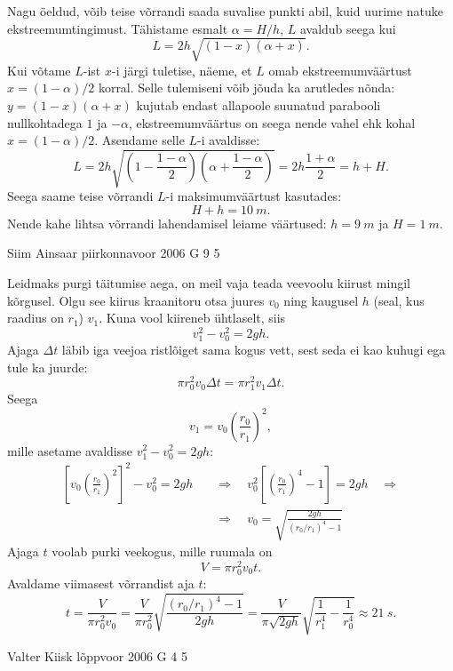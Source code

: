 \documentclass[11pt, twoside]{article}
\begin{document}
{{Nagu öeldud, võib teise võrrandi saada suvalise punkti abil, kuid uurime natuke ekstreemumtingimust. Tähistame esmalt $\alpha = H/h$, $L$ avaldub seega kui
\[
L=2 h \sqrt{(1-x)(\alpha+x)}.
\]
Kui võtame $L$-ist $x$-i järgi tuletise, näeme, et $L$ omab ekstreemumväärtust $x = (1 - \alpha )/2$ korral. Selle tulemiseni võib jõuda ka arutledes nõnda: $y = (1-x)(\alpha +x)$ kujutab endast allapoole suunatud parabooli nullkohtadega $1$ ja $-\alpha$, ekstreemumväärtus on seega nende vahel ehk kohal $x = (1 - \alpha )/2$. Asendame selle $L$-i avaldisse:
\[
L=2 h \sqrt{\left(1-\frac{1-\alpha}{2}\right)\left(\alpha+\frac{1-\alpha}{2}\right)}=2 h \frac{1+\alpha}{2}=h+H.
\]
Seega saame teise võrrandi $L$-i maksimumväärtust kasutades:
\[
H + h = \SI{10}{m}.
\]
Nende kahe lihtsa võrrandi lahendamisel leiame väärtused: $h = \SI{9}{m}$ ja $H = \SI{1}{m}$.
\fi
}

{Siim Ainsaar} %
{piirkonnavoor} %
{2006} %
{G 9} %
{5} %
{

\ifSolution
Leidmaks purgi täitumise aega, on meil vaja teada veevoolu kiirust mingil kõrgusel. Olgu see kiirus kraanitoru otsa juures $v_0$ ning kaugusel $h$ (seal, kus raadius on $r_1$) $v_1$. Kuna vool kiireneb ühtlaselt, siis
\[
v_1^2 - v_0^2 = 2gh.
\]
Ajaga $\Delta t$ läbib iga veejoa ristlõiget sama kogus vett, sest seda ei kao kuhugi ega tule ka juurde:
\[
\pi r_0^2 v_0\Delta t = \pi r_1^2 v_1\Delta t.
\]
Seega
\[
v_1 = v_0 \left(\frac{r_0}{r_1}\right)^2,
\]
mille asetame avaldisse $v_1^2-v_0^2=2gh$:
\[
\begin{aligned}
\left[v_{0}\left(\frac{r_{0}}{r_{1}}\right)^{2}\right]^{2}-v_{0}^{2}=2 g h \quad&\Rightarrow\quad v_{0}^{2}\left[\left(\frac{r_{0}}{r_{1}}\right)^{4}-1\right]=2 g h \quad\Rightarrow\\
&\Rightarrow \quad v_{0}=\sqrt{\frac{2 g h}{\left(r_{0} / r_{1}\right)^{4}-1}}
\end{aligned}
\]
Ajaga $t$ voolab purki veekogus, mille ruumala on
\[
V = \pi r_0^2 v_0t.
\]
Avaldame viimasest võrrandist aja $t$:
\[
t=\frac{V}{\pi r_{0}^{2} v_{0}}=\frac{V}{\pi r_{0}^{2}} \sqrt{\frac{\left(r_{0} / r_{1}\right)^{4}-1}{2 g h}} = \frac{V}{\pi \sqrt{2 g h}} \sqrt{\frac{1}{r_{1}^{4}}-\frac{1}{r_{0}^{4}}}\approx \SI{21}{s}.
\]
\fi
}

{Valter Kiisk} %
{lõppvoor} %
{2006} %
{G 4} %
{5} %
{

}}
\end{document}
